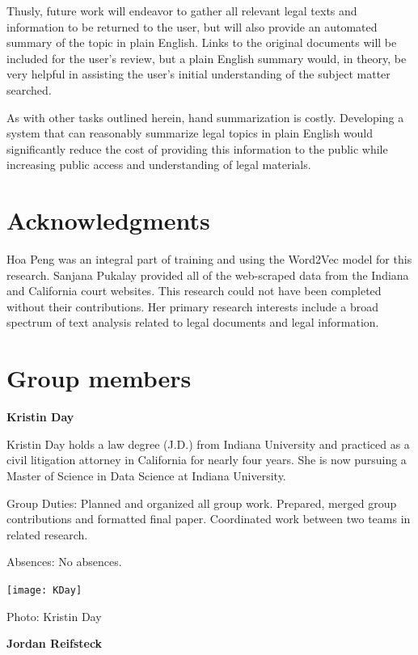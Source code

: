 \documentclass[11pt]{article}
\begin{document}
Thusly, future work will endeavor to gather all relevant legal texts and information to be returned to the user, but will also provide an automated summary of the topic in plain English.  Links to the original documents will be included for the user's review, but a plain English summary would, in theory, be very helpful in assisting the user's initial understanding of the subject matter searched.  

As with other tasks outlined herein, hand summarization is costly.  Developing a system that can reasonably summarize legal topics in plain English would significantly reduce the cost of providing this information to the public while increasing public access and understanding of legal materials.



\section*{Acknowledgments}

Hoa Peng was an integral part of training and using the Word2Vec model for this research.  Sanjana Pukalay provided all of the web-scraped data from the Indiana and California court websites.  This research could not have been completed without their contributions.  Her primary research interests include a broad spectrum of text analysis related to legal documents and legal information.  




\section*{Group members}
\noindent \textbf{Kristin Day}

Kristin Day holds a law degree (J.D.) from Indiana University and practiced as a civil litigation attorney in California for nearly four years.  She is now pursuing a Master of Science in Data Science at Indiana University.  

Group Duties:  Planned and organized all group work.  Prepared, merged group contributions and formatted final paper.  Coordinated work between two teams in related research. 

Absences:  No absences.
 
\vspace{5mm}
\texttt{[image: KDay]}

Photo: Kristin Day

\vspace{10mm}
\noindent \textbf{Jordan Reifsteck}
\end{document}
